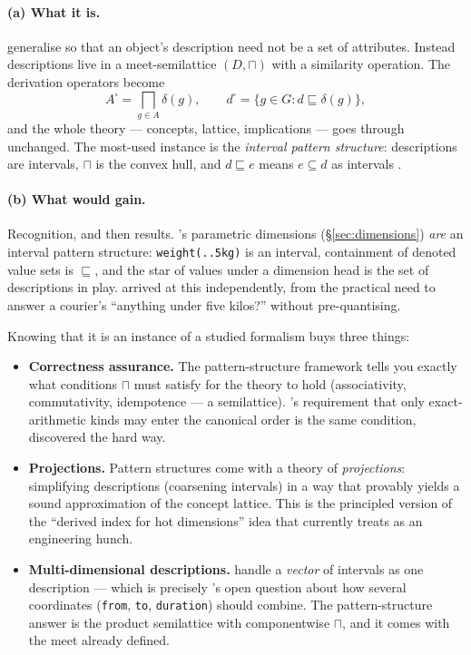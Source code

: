 \paragraph{(a) What it is.} \citet{ganter2001} generalise \fca{} so that an
object's description need not be a set of attributes. Instead descriptions
live in a meet-semilattice $(D, \sqcap)$ with a similarity operation. The
derivation operators become
\[
  A^{\square} = \bigsqcap_{g \in A} \delta(g),
  \qquad
  d^{\square} = \{g \in G : d \sqsubseteq \delta(g)\},
\]
and the whole theory --- concepts, lattice, implications --- goes through
unchanged. The most-used instance is the \emph{interval pattern structure}:
descriptions are intervals, $\sqcap$ is the convex hull, and $d \sqsubseteq e$
means $e \subseteq d$ as intervals \citep{kaytoue2011}.

\paragraph{(b) What \odag{} would gain.} Recognition, and then results.
\odag{}'s parametric dimensions (\S\ref{sec:dimensions}) \emph{are} an
interval pattern structure: \verb|weight(..5kg)| is an interval,
containment of denoted value sets is $\sqsubseteq$, and the star of values
under a dimension head is the set of descriptions in play. \odag{} arrived at
this independently, from the practical need to answer a courier's
``anything under five kilos?'' without pre-quantising.

Knowing that it is an instance of a studied formalism buys three things:

\begin{itemize}[leftmargin=1.4em]
\item \textbf{Correctness assurance.} The pattern-structure framework tells
  you exactly what conditions $\sqcap$ must satisfy for the theory to hold
  (associativity, commutativity, idempotence --- a semilattice). \odag{}'s
  requirement that only exact-arithmetic kinds may enter the canonical order
  is the same condition, discovered the hard way.
\item \textbf{Projections.} Pattern structures come with a theory of
  \emph{projections}: simplifying descriptions (coarsening intervals) in a way
  that provably yields a sound approximation of the concept lattice. This is
  the principled version of the ``derived index for hot dimensions'' idea that
  \odag{} currently treats as an engineering hunch.
\item \textbf{Multi-dimensional descriptions.} \citet{kaytoue2011} handle a
  \emph{vector} of intervals as one description --- which is precisely
  \odag{}'s open question about how several coordinates
  (\verb|from|, \verb|to|, \verb|duration|) should combine. The
  pattern-structure answer is the product semilattice with componentwise
  $\sqcap$, and it comes with the meet already defined.
\end{itemize}

